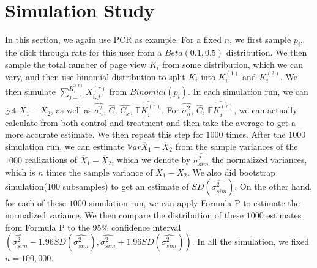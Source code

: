 \documentclass[12pt,letterpaper]{article}
\newcommand{\wht}{\widehat}
\newcommand{\var}{\ensuremath{\mathbb Var}}
\newcommand{\bbe}{\mathbb{E}}
\newcommand{\xbar}{\overline{X}}
\newcommand{\naiveest}{\wht{\sigma^2_n}}
\begin{document}
\section{Simulation Study}\label{p_sim}
In this section, we again use PCR as example. 
For a fixed $n$, we first sample $p_i$, the click through rate for this user from a $Beta(0.1,0.5)$ distribution. We then sample the total number of page view $K_i$ from some distribution, which we can vary, and then use binomial distribution to split $K_i$ into $K_i^{(1)}$ and $K_i^{(2)}$. We then simulate $\sum_{j=1}^{K_i^{(r)}}X_{i,j}^{(r)}$ from $Binomial(p_i)$. 
In each simulation run, we can get $\xbar_1-\xbar_2$, as well as  $\naiveest$, $\wht{C}$, $\wht{C_x}$, $\wht{\bbe K_i^{(r)}}$. For $\naiveest$, $\wht{C}$,  $\wht{\bbe K_i^{(r)}}$, we can actually calculate from both control and treatment and then take the average to get a more accurate estimate. We then repeat this step for $1000$ times. After the $1000$ simulation run, we can estimate $\var{\xbar_1-\xbar_2}$ from the sample variances of the $1000$ realizations of $\xbar_1-\xbar_2$, which we denote by $\wht{\sigma^2_{sim}}$ the normalized variances, which is $n$ times the sample variance of $\xbar_1-\xbar_2$. We also did bootstrap simulation(100 subsamples) to get an estimate of $SD(\wht{\sigma^2_{sim}})$. On the other hand, for each of these $1000$ simulation run, we can apply Formula P to estimate the normalized variance. We then compare the distribution of these $1000$ estimates from Formula P to the 95\% confidence interval $(\wht{\sigma^2_{sim}} - 1.96SD(\wht{\sigma^2_{sim}}), \wht{\sigma^2_{sim}} + 1.96SD(\wht{\sigma^2_{sim}}))$. In all the simulation, we fixed $n=100,000$.
\end{document}
